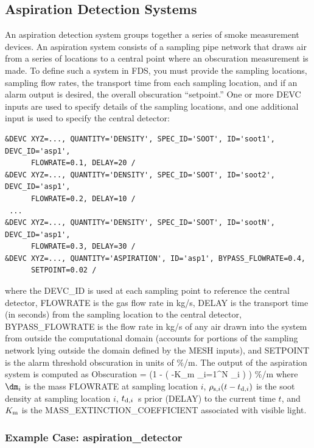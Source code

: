 \documentclass[11pt]{book}
\begin{document}
\subsection{Aspiration Detection Systems}
\label{info:aspiration_detector}

An aspiration detection system groups together a series of smoke measurement devices. An aspiration system consists of a sampling pipe network that draws air from a series of locations to a central point where an obscuration measurement is made.  To define such a system in FDS, you must provide the sampling locations, sampling flow rates, the transport time from each sampling location, and if an alarm output is desired, the overall obscuration ``setpoint.''  One or more {\ct DEVC} inputs are used to specify details of the sampling locations, and one additional input is used to specify the central detector:
\begin{lstlisting}
&DEVC XYZ=..., QUANTITY='DENSITY', SPEC_ID='SOOT', ID='soot1', DEVC_ID='asp1',
      FLOWRATE=0.1, DELAY=20 /
&DEVC XYZ=..., QUANTITY='DENSITY', SPEC_ID='SOOT', ID='soot2', DEVC_ID='asp1',
      FLOWRATE=0.2, DELAY=10 /
 ...
&DEVC XYZ=..., QUANTITY='DENSITY', SPEC_ID='SOOT', ID='sootN', DEVC_ID='asp1',
      FLOWRATE=0.3, DELAY=30 /
&DEVC XYZ=..., QUANTITY='ASPIRATION', ID='asp1', BYPASS_FLOWRATE=0.4,
      SETPOINT=0.02 /
\end{lstlisting}
where the {\ct DEVC\_ID} is used at each sampling point to reference the central detector, {\ct FLOWRATE} is the gas flow rate in kg/s, {\ct DELAY} is the transport time (in seconds) from the sampling location to the central detector, {\ct BYPASS\_FLOWRATE} is the flow rate in kg/s of any air drawn into the system from outside the computational
domain (accounts for portions of the sampling network lying outside the domain defined by the {\ct MESH} inputs), and {\ct SETPOINT} is the alarm threshold obscuration in units of \%/m. The output of the aspiration system is computed as
\be
  \hbox{Obscuration}  = \left(1 - \exp \left( -K_{\rm m}  {\sum_{i=1}^N{ \dm_i} } \right)  \right)   \; \; \hbox{\%/m}
\ee
where $\dm_i$ is the mass {\ct FLOWRATE} at sampling location $i$, $\rho_{{\rm s},i}( t-t_{{\rm d},i})$ is the soot density at sampling location $i$, $t_{{\rm d},i}$~s prior ({\ct DELAY}) to the current time $t$, and $K_{\rm m}$ is the {\ct MASS\_EXTINCTION\_COEFFICIENT} associated with visible light.

\subsubsection{Example Case: aspiration\_detector}
\end{document}
